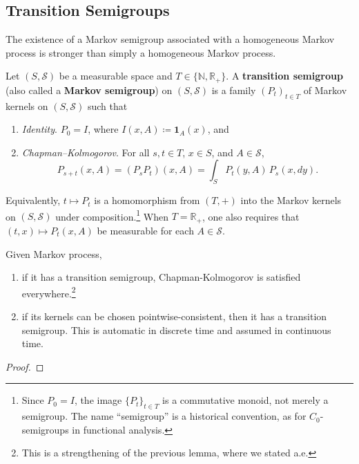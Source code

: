 \subsection{Transition Semigroups}

	The existence of a Markov semigroup associated with a homogeneous Markov process is stronger than simply a homogeneous Markov process. 

	\begin{definition}
		\label{def:transition-semigroup}
		\label{def:markov-semigroup}
		Let $(S, \mathcal{S})$ be a measurable space and $T \in \{\mathbb{N}, \mathbb{R}_+\}$. A \textbf{transition semigroup} (also called a \textbf{Markov semigroup}) on $(S, \mathcal{S})$ is a family $(P_t)_{t \in T}$ of Markov kernels on $(S, \mathcal{S})$ such that
		\begin{enumerate}
			\item \textit{Identity}. $P_0 = I$, where $I(x, A) \coloneqq \mathbf{1}_A(x)$, and
			\item \textit{Chapman--Kolmogorov}. For all $s, t \in T$, $x \in S$, and $A \in \mathcal{S}$,
			\begin{equation}
				P_{s+t}(x, A) = (P_s P_t)(x, A) = \int_S P_t(y, A) \, P_s(x, dy).
			\end{equation}
		\end{enumerate}
		Equivalently, $t \mapsto P_t$ is a homomorphism from $(T, +)$ into the Markov kernels on $(S, \mathcal{S})$ under composition.\footnote{Since $P_0 = I$, the image $\{P_t\}_{t \in T}$ is a commutative monoid, not merely a semigroup. The name ``semigroup'' is a historical convention, as for $C_0$-semigroups in functional analysis.} When $T = \mathbb{R}_+$, one also requires that $(t, x) \mapsto P_t(x, A)$ be measurable for each $A \in \mathcal{S}$.
	\end{definition}

	\begin{lemma}
		Given Markov process, 
		\begin{enumerate}
		  \item if it has a transition semigroup, Chapman-Kolmogorov is satisfied everywhere.\footnote{This is a strengthening of the previous lemma, where we stated a.e.}
			\item if its kernels can be chosen pointwise-consistent, then it has a transition semigroup. This is automatic in discrete time and assumed in continuous time. 
		\end{enumerate}
	\end{lemma}
	\begin{proof}
	  
	\end{proof}

